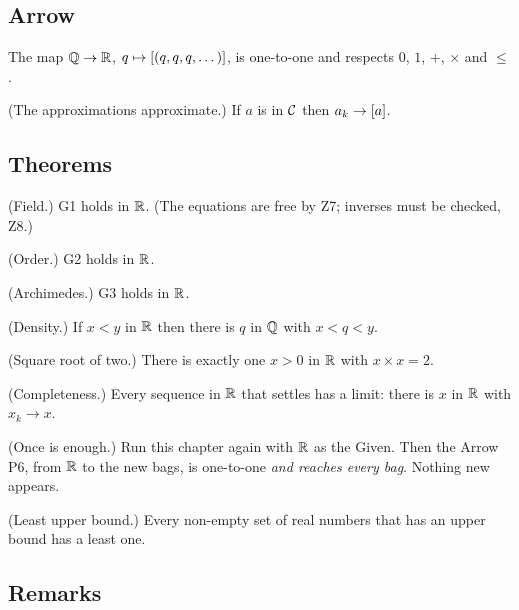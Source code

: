 \subsection*{Arrow}

\begin{lines}
\item[\lab{P6}] The map $\mathbb{Q} \to \mathbb{R}$, $q \mapsto [(q, q, q, \dots)]$, is one-to-one and respects $0$, $1$, $+$, $\times$ and $\le$.
\item[\lab{P7}] (The approximations approximate.) If $a$ is in $\mathcal{C}$ then $a_k \to [a]$.
\end{lines}

\subsection*{Theorems}

\begin{lines}
\item[\lab{T1}] (Field.) G1 holds in $\mathbb{R}$. (The equations are free by Z7; inverses must be checked, Z8.)
\item[\lab{T2}] (Order.) G2 holds in $\mathbb{R}$.
\item[\lab{T3}] (Archimedes.) G3 holds in $\mathbb{R}$.
\item[\lab{T4}] (Density.) If $x < y$ in $\mathbb{R}$ then there is $q$ in $\mathbb{Q}$ with $x < q < y$.
\item[\lab{T5}] (Square root of two.) There is exactly one $x > 0$ in $\mathbb{R}$ with $x \times x = 2$.
\item[\lab{T6}] (Completeness.) Every sequence in $\mathbb{R}$ that settles has a limit: there is $x$ in $\mathbb{R}$ with $x_k \to x$.
\item[\lab{T7}] (Once is enough.) Run this chapter again with $\mathbb{R}$ as the Given. Then the Arrow P6, from $\mathbb{R}$ to the new bags, is one-to-one \emph{and reaches every bag}. Nothing new appears.
\item[\lab{T8}] (Least upper bound.) Every non-empty set of real numbers that has an upper bound has a least one.
\end{lines}

\subsection*{Remarks}

